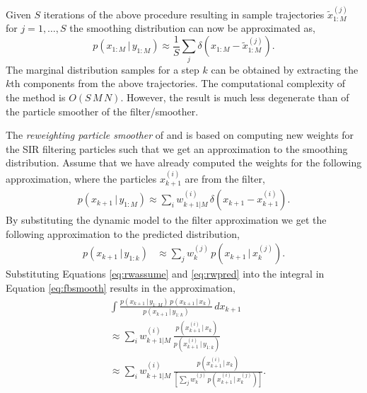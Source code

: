 \documentclass[twocolumn]{autart}    %
\begin{document}
%
Given $S$ iterations of the above procedure resulting in sample trajectories $\tilde{x}_{1:M}^{(j)}$ for $j=1,\ldots,S$ the smoothing distribution can now be approximated as,
%
\begin{equation}
     p(x_{1:M}\,|\,y_{1:M}) \approx
      \frac{1}{S} \sum_j \delta(x_{1:M} - \tilde{x}_{1:M}^{(j)}).
\end{equation}
%
The marginal distribution samples for a step $k$ can be obtained by extracting the $k$th components from the above trajectories. The computational complexity of the method is $O(S \, M \, N)$. However, the result is much less degenerate than of the particle smoother of the filter/smoother.

The {\em reweighting particle smoother} of \cite{Hurzeler+Kunsch:1998} and \cite{Doucet+Godsill+Andrieu:2000} is based on computing new weights for the SIR filtering particles such that we get an approximation to the smoothing distribution. Assume that we have already computed the weights for the following approximation, where the particles $x_{k+1}^{(i)}$ are from the filter,
%
\begin{equation}
\begin{split}
   p(x_{k+1}\,|\,y_{1:M})
   \approx
   \sum_i w^{(i)}_{k+1|M} \, \delta(x_{k+1} - x_{k+1}^{(i)}).
\end{split}
\label{eq:rwassume}
\end{equation}
%
By substituting the dynamic model to the filter approximation we get the following approximation to the predicted distribution,
%
\begin{equation}
\begin{split}
  p(x_{k+1}\,|\,y_{1:k})
  &\approx \sum_j w_k^{(j)} \, p(x_{k+1}\,|\,x_{k}^{(j)}).
\end{split}
\label{eq:rwpred}
\end{equation}
%
Substituting Equations \eqref{eq:rwassume} and \eqref{eq:rwpred} into the integral in Equation \eqref{eq:fbsmooth} results in the approximation,
%
\begin{equation}
\begin{split}
  &\int \frac{p(x_{k+1} \,|\, y_{1:M}) \, p(x_{k+1}\,|\,x_{k})}
           {p(x_{k+1}\,|\,y_{1:k})} \, dx_{k+1} \\
  &\approx
  \sum_i w^{(i)}_{k+1|M} \,
  \frac{p(x_{k+1}^{(i)}\,|\,x_{k})}{p(x_{k+1}^{(i)}\,|\,y_{1:k})} \\
  &\approx
  \sum_i w^{(i)}_{k+1|M} \,
  \frac{p(x_{k+1}^{(i)}\,|\,x_{k})}
   {\left[ \sum_j w_k^{(j)} \, p(x_{k+1}^{(i)}\,|\,x_{k}^{(j)}) \right]}.
\end{split}
\end{equation}
\end{document}
